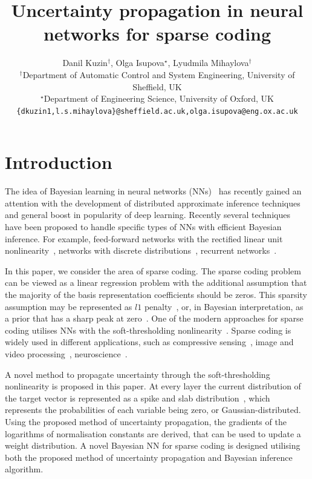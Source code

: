 \documentclass{article}
\title{Uncertainty propagation in neural networks for sparse coding}
\author{
Danil Kuzin$^{\dagger}$, Olga Isupova$^{\star}$, Lyudmila Mihaylova$^{\dagger}$\\
$^{\dagger}$Department of Automatic Control
and System Engineering,
University of Sheffield, UK \\ 
$^{\star}$Department of Engineering Science,
University of Oxford, UK \\
\texttt{\{dkuzin1,l.s.mihaylova\}@sheffield.ac.uk,olga.isupova@eng.ox.ac.uk}
}
\begin{document}
\maketitle
\section{Introduction}
  The idea of Bayesian learning in neural networks (NNs)~\cite{neal2012bayesian} has recently gained an attention with the development of distributed approximate inference techniques~\cite{li2015stochastic, hoffman2013stochastic} and general boost in popularity of deep learning. Recently several techniques~\cite{ranganath2015deep, gal2016dropout} have been proposed to handle specific types of NNs with efficient Bayesian inference. For example, feed-forward networks with the rectified linear unit nonlinearity~\cite{hernandez2015probabilistic}, networks with discrete distributions~\cite{soudry2014expectation}, recurrent networks~\cite{mcdermott2017bayesian}.

  In this paper, we consider the area of sparse coding. The sparse coding problem can be viewed as a linear regression problem with the additional assumption that the majority of the basis representation coefficients should be zeros. This sparsity assumption may be represented as $l1$ penalty~\cite{tibshirani1996regression}, or, in Bayesian interpretation, as a prior that has a sharp peak at zero~\cite{tipping2001sparse}. One of the modern approaches for sparse coding utilises NNs with the soft-thresholding nonlinearity~\cite{gregor2010learning, sprechmann2015learning}. Sparse coding is widely used in different applications, such as compressive sensing~\cite{candes2008introduction}, image and video processing~\cite{mairal2014sparse, wang2015deep}, neuroscience~\cite{baillet1997bayesian, jas2017learning}.

  A novel method to propagate uncertainty through the soft-thresholding nonlinearity is proposed in this paper. At every layer the current distribution of the target vector is represented as a spike and slab distribution~\cite{mitchell1988bayesian}, which represents the probabilities of each variable being zero, or Gaussian-distributed. Using the proposed method of uncertainty propagation, the gradients of the logarithms of normalisation constants are derived, that can be used to update a weight distribution. A novel Bayesian NN for sparse coding is designed utilising both the proposed method of uncertainty propagation and Bayesian inference algorithm.
\end{document}
